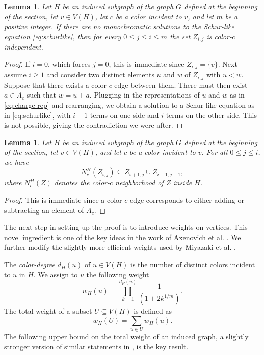 \documentclass[11pt]{article}
\theoremstyle{plain}
\newtheorem{lemma}[theorem]{Lemma}
\theoremstyle{definition}
\theoremstyle{definition}
\theoremstyle{remark}
\begin{document}
\begin{lemma}\label{lem:independence}
Let \(H\) be an induced subgraph of the graph $G$ defined at the beginning of the section, let \(v \in V(H)\), let \(c\) be a color incident to \(v\), and let $m$ be a positive integer. If there are no monochromatic solutions to the Schur-like equation \eqref{eq:schurlike}, then for every \(0 \leq j \leq i\leq m\) the set \(Z_{i,j}\) is color-\(c\) independent.
\end{lemma}

\begin{proof} If $i=0$, which forces $j=0$, this is immediate since $Z_{i,j}=\{v\}$. Next assume $i \geq 1$ and consider two distinct elements \(u\) and \(w\) of \(Z_{i,j}\) with \(u<w\). Suppose that there exists a color-\(c\) edge between them. There must then exist $a \in A_c$ such that $w = u + a$. Plugging in the representations of \(u\) and \(w\) as in \eqref{eq:charge-rep} and rearranging, we obtain a solution to a Schur-like equation as in \eqref{eq:schurlike}, with \(i+1\) terms on one side and \(i\) terms on the other side. This is not possible, giving the contradiction we were after.
\end{proof}

\begin{lemma}\label{lem:branching}
Let \(H\) be an induced subgraph of the graph $G$ defined at the beginning of the section, let \(v \in V(H)\), and let \(c\) be a color incident to \(v\). For all \(0\leq j \leq i\), we have 
\[
 N_{c}^{H}(Z_{i,j}) \subseteq Z_{i+1,j} \cup Z_{i+1,j+1},
 \] 
 where
\(N_{c}^{H}(Z)\) denotes the color-\(c\) neighborhood of \(Z\) inside \(H\).
\end{lemma}

\begin{proof} 
This is immediate since a color-\(c\) edge corresponds to either adding or subtracting an element of \(A_{c}\).
\end{proof}

The next step in setting up the proof is to introduce weights on vertices. This novel ingredient is one of the key ideas in the work of Axenovich et al. \cite{ACJMR2026}. We further modify the slightly more efficient weights used by Miyazaki et al. \cite{MMPZ2026}.

The \emph{color-degree} \(d_{H}(u)\) of \(u \in V(H)\) is the number of distinct colors incident to $u$ in \(H\). We assign to \(u\) the following weight
\begin{equation} \label{eq:weights}
 w_H(u) = \prod_{k=1}^{d_H(u)} \frac{1}{(1+ 2 k^{1/m})}.
\end{equation}
 The total weight of
a subset \(U\subseteq V(H)\) is defined as
\[
 w_{H}(U)=\sum_{u\in U}w_{H}(u). 
 \]
The following upper bound on the total weight of an induced graph, a slightly stronger version of similar statements in \cite{ACJMR2026,MMPZ2026}, is the key result.
\end{document}
